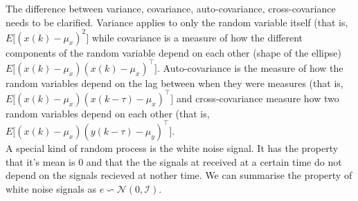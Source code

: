 The difference between variance, covariance, auto-covariance, cross-covariance needs to be clarified. Variance applies to only the random variable itself (that is, $E\Big[ (x(k) - \mu_{x})^{2}\Big]$ while covariance is a measure of how the different components of the random variable depend on each other (shape of the ellipse) $E\Big[ (x(k) - \mu_{x})(x(k) - \mu_{x})^{\top}\Big]$. Auto-covariance is the measure of how the random variables depend on the lag between when they were measures (that is, $E\Big[ (x(k) - \mu_{x})(x(k - \tau) - \mu_{x})^{\top}\Big]$ and cross-covariance measure how two random variables depend on each other (that is, $E\Big[ (x(k) - \mu_{x})(y(k - \tau) - \mu_{y})^{\top}\Big]$.\\
\newline
A special kind of random process is the white noise signal. It has the property that it's mean is 0 and that the the signals at received at a certain time do not depend on the signals recieved at nother time. We can summarise the property of white noise signals as $e \backsim \mathcal{N}(0, \mathcal{I})$. 



















